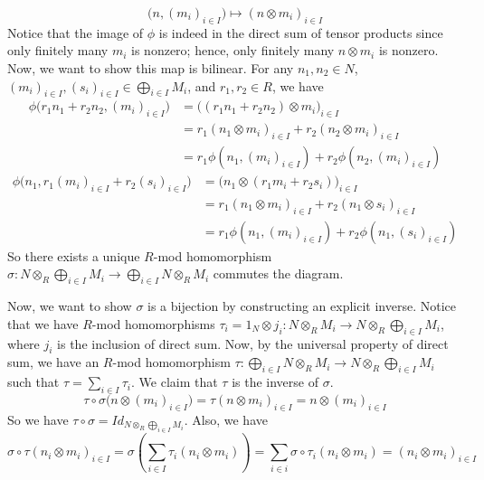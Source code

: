 \documentclass[12pt]{amsart}
\begin{document}
\[\Big(n,(m_i)_{i\in I}\Big)\mapsto (n\otimes m_i)_{i\in I}\]
Notice that the image of $\phi$ is indeed in the direct sum of tensor products since only finitely many $m_i$ is nonzero; hence, only finitely many $n\otimes m_i$ is nonzero. Now, we want to show this map is bilinear. For any $n_1,n_2\in N$, $(m_i)_{i\in I}, (s_i)_{i\in I}\in \bigoplus_{i\in I} M_i$, and $r_1,r_2\in R$, we have
\begin{align*}
    \phi\Big(r_1n_1+r_2n_2,(m_i)_{i\in I}\Big) & =\Big((r_1n_1+r_2n_2)\otimes m_i\Big)_{i\in I} \\ &=r_1(n_1\otimes m_i)_{i\in I}+r_2(n_2\otimes m_i)_{i\in I}\\ &=r_1\phi(n_1,(m_i)_{i\in I})+r_2\phi(n_2,(m_i)_{i\in I})
\end{align*}
\begin{align*}
    \phi\Big(n_1,r_1(m_i)_{i\in I}+r_2(s_i)_{i\in I}\Big) & =\Big(n_1\otimes (r_1m_i+r_2s_i)\Big)_{i\in I} \\ &=r_1(n_1\otimes m_i)_{i\in I}+r_2(n_1\otimes s_i)_{i\in I}\\ &=r_1\phi(n_1,(m_i)_{i\in I})+r_2\phi(n_1,(s_i)_{i\in I})
\end{align*}
So there exists a unique $R$-mod homomorphism $\sigma: N\otimes_R \bigoplus_{i\in I} M_i\to \bigoplus_{i\in I} N\otimes_R M_i$ commutes the diagram.
\begin{center}
\end{center}
Now, we want to show $\sigma$ is a bijection by constructing an explicit inverse. Notice that we have $R$-mod homomorphisms $\tau_i=1_N\otimes j_i: N\otimes_R M_i\to N\otimes_R \bigoplus_{i\in I} M_i$, where $j_i$ is the inclusion of direct sum. Now, by the universal property of direct sum, we have an $R$-mod homomorphism $\tau:\bigoplus_{i\in I} N\otimes_R M_i\to N\otimes_R \bigoplus_{i\in I} M_i$ such that $\tau=\sum_{i\in I}\tau_i$. We claim that $\tau$ is the inverse of $\sigma$.
\[\tau\circ \sigma\Big(n\otimes (m_i)_{i\in I}\Big)=\tau(n\otimes m_i)_{i\in I}=n\otimes (m_i)_{i\in I} \]
So we have $\tau\circ \sigma=Id_{N\otimes_R \bigoplus_{i\in I} M_i}$.
Also, we have
\[\sigma\circ \tau(n_i\otimes m_i)_{i\in I}=\sigma(\sum_{i\in I}\tau_i(n_i\otimes m_i))=\sum_{i\in i}\sigma\circ \tau_i(n_i\otimes m_i)=(n_i\otimes m_i)_{i\in I}\]
\end{document}
